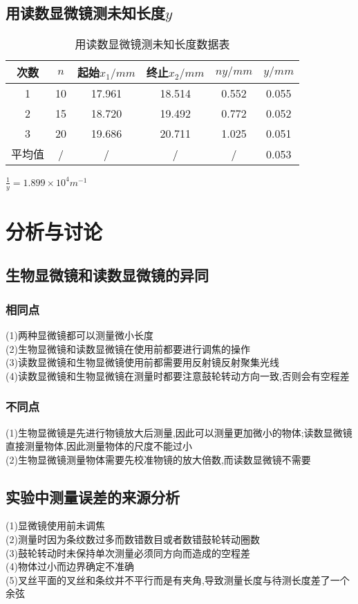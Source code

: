 \documentclass[a4 paper,12pt]{article}
\begin{document}
\subsection{用读数显微镜测未知长度$y$}
\begin{table}[H] 
	\caption{用读数显微镜测未知长度数据表}
	\label{用读数显微镜测未知长度数据表}
	\centering
		\begin{tabular}{cccccc}
			\toprule[0.5mm]
			次数 & $n$ & 起始$x_{1}/mm $ & 终止$x_{2}/mm$&$ny/mm$&$y/mm$  \\
			\midrule
			1 & 10  & 17.961  & 18.514&0.552&0.055 \\
			2 & 15 & 18.720  & 19.492&0.772&0.052  \\
			3 & 20  & 19.686  & 20.711&1.025&0.051  \\
			平均值&/&/&/&/&0.053  \\
			\bottomrule[0.5mm]
	\end{tabular}
\end{table}
$\frac{1}{y}=1.899 \times 10^{4} m^{-1}$\\

\section{分析与讨论}

\subsection{生物显微镜和读数显微镜的异同}
\subsubsection{相同点}
\noindent
(1)两种显微镜都可以测量微小长度\\
(2)生物显微镜和读数显微镜在使用前都要进行调焦的操作\\
(3)读数显微镜和生物显微镜使用前都需要用反射镜反射聚集光线\\
(4)读数显微镜和生物显微镜在测量时都要注意鼓轮转动方向一致,否则会有空程差
\subsubsection{不同点}
\noindent
(1)生物显微镜是先进行物镜放大后测量,因此可以测量更加微小的物体;读数显微镜直接测量物体,因此测量物体的尺度不能过小\\
(2)生物显微镜测量物体需要先校准物镜的放大倍数,而读数显微镜不需要
\subsection{实验中测量误差的来源分析}
\noindent
(1)显微镜使用前未调焦\\
(2)测量时因为条纹数过多而数错数目或者数错鼓轮转动圈数\\
(3)鼓轮转动时未保持单次测量必须同方向而造成的空程差\\
(4)物体过小而边界确定不准确\\
(5)叉丝平面的叉丝和条纹并不平行而是有夹角,导致测量长度与待测长度差了一个余弦
\end{document}

